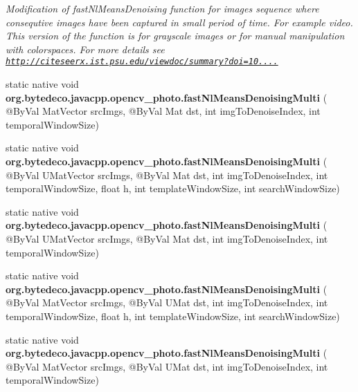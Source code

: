\begin{DoxyCompactItemize}
\begin{DoxyCompactList}\small\item\em Modification of fast\+Nl\+Means\+Denoising function for images sequence where consequtive images have been captured in small period of time. For example video. This version of the function is for grayscale images or for manual manipulation with colorspaces. For more details see \href{http://citeseerx.ist.psu.edu/viewdoc/summary?doi=10.1.1.131.6394}{\tt http\+://citeseerx.\+ist.\+psu.\+edu/viewdoc/summary?doi=10....} \end{DoxyCompactList}\item 
\mbox{\label{group__photo__denoise_gaa0f7e73b107e0840510677999c76cb9f}} 
static native void {\bfseries org.\+bytedeco.\+javacpp.\+opencv\+\_\+photo.\+fast\+Nl\+Means\+Denoising\+Multi} ( @By\+Val Mat\+Vector src\+Imgs, @By\+Val Mat dst, int img\+To\+Denoise\+Index, int temporal\+Window\+Size)
\item 
\mbox{\label{group__photo__denoise_ga9510649e1f2743a0b8396413803e7e00}} 
static native void {\bfseries org.\+bytedeco.\+javacpp.\+opencv\+\_\+photo.\+fast\+Nl\+Means\+Denoising\+Multi} ( @By\+Val U\+Mat\+Vector src\+Imgs, @By\+Val Mat dst, int img\+To\+Denoise\+Index, int temporal\+Window\+Size, float h, int template\+Window\+Size, int search\+Window\+Size)
\item 
\mbox{\label{group__photo__denoise_ga55237c48a5e475bbd54f48935209d3f0}} 
static native void {\bfseries org.\+bytedeco.\+javacpp.\+opencv\+\_\+photo.\+fast\+Nl\+Means\+Denoising\+Multi} ( @By\+Val U\+Mat\+Vector src\+Imgs, @By\+Val Mat dst, int img\+To\+Denoise\+Index, int temporal\+Window\+Size)
\item 
\mbox{\label{group__photo__denoise_gadf284f4ebdc10c89953ae4273ea04b4a}} 
static native void {\bfseries org.\+bytedeco.\+javacpp.\+opencv\+\_\+photo.\+fast\+Nl\+Means\+Denoising\+Multi} ( @By\+Val Mat\+Vector src\+Imgs, @By\+Val U\+Mat dst, int img\+To\+Denoise\+Index, int temporal\+Window\+Size, float h, int template\+Window\+Size, int search\+Window\+Size)
\item 
\mbox{\label{group__photo__denoise_ga5e5edc198348e04fede60be5624e2a3d}} 
static native void {\bfseries org.\+bytedeco.\+javacpp.\+opencv\+\_\+photo.\+fast\+Nl\+Means\+Denoising\+Multi} ( @By\+Val Mat\+Vector src\+Imgs, @By\+Val U\+Mat dst, int img\+To\+Denoise\+Index, int temporal\+Window\+Size)

\end{DoxyCompactItemize}
